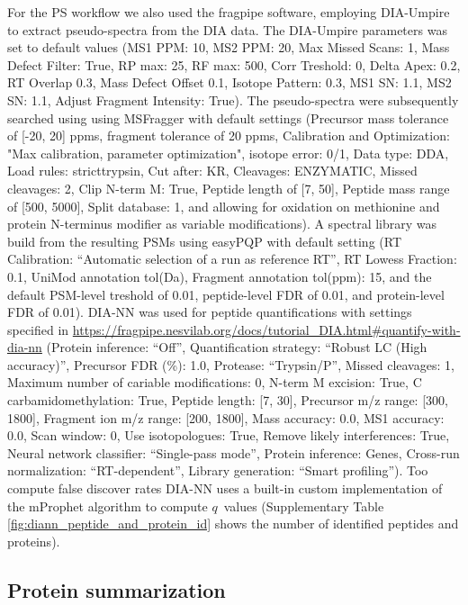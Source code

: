 \documentclass[10pt,letterpaper]{article}
\begin{document}
For the PS workflow we also used the fragpipe software, employing DIA-Umpire to extract pseudo-spectra from the DIA data. The DIA-Umpire parameters was set to default values (MS1 PPM: 10, MS2 PPM: 20, Max Missed Scans: 1, Mass Defect Filter: True, RP max: 25, RF max: 500, Corr Treshold: 0, Delta Apex: 0.2, RT Overlap 0.3, Mass Defect Offset 0.1, Isotope Pattern: 0.3, MS1 SN: 1.1, MS2 SN: 1.1, Adjust Fragment Intensity: True). The pseudo-spectra were subsequently searched using using MSFragger with default settings (Precursor mass tolerance of [-20, 20] ppms, fragment tolerance of 20 ppms, Calibration and Optimization: "Max calibration, parameter optimization", isotope error: 0/1, Data type: DDA, Load rules: stricttrypsin, Cut after: KR, Cleavages: ENZYMATIC, Missed cleavages: 2, Clip N-term M: True, Peptide length of [7, 50], Peptide mass range of [500, 5000], Split database: 1, and allowing for oxidation on methionine and protein N-terminus modifier as variable modifications). A spectral library was build from the resulting PSMs using easyPQP with default setting (RT Calibration: ``Automatic selection of a run as reference RT'', RT Lowess Fraction: 0.1, UniMod annotation tol(Da), Fragment annotation tol(ppm): 15, and the default PSM-level treshold of 0.01, peptide-level FDR of 0.01, and protein-level FDR of 0.01). DIA-NN was used for peptide quantifications with settings specified in \url{https://fragpipe.nesvilab.org/docs/tutorial_DIA.html#quantify-with-dia-nn} (Protein inference: ``Off'', Quantification strategy: ``Robust LC (High accuracy)'', Precursor FDR (\%): 1.0, Protease: ``Trypsin/P'', Missed cleavages: 1, Maximum number of cariable modifications: 0, N-term M excision: True, C carbamidomethylation: True, Peptide length: [7, 30], Precursor m/z range: [300, 1800], Fragment ion m/z range: [200, 1800], Mass accuracy: 0.0, MS1 accuracy: 0.0, Scan window: 0, Use isotopologues: True, Remove likely interferences: True, Neural network classifier: ``Single-pass mode'', Protein inference: Genes, Cross-run normalization: ``RT-dependent'', Library generation: ``Smart profiling''). Too compute false discover rates DIA-NN uses a built-in custom implementation of the mProphet algorithm to compute $q$~values \cite{reiter2011mprophet, demichev2020dia} (Supplementary Table \ref{fig:diann_peptide_and_protein_id} shows the number of identified peptides and proteins). 
 
\subsection*{Protein summarization}
\end{document}
